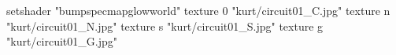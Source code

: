 setshader "bumpspecmapglowworld"
    texture 0 "kurt/circuit01_C.jpg"
    texture n "kurt/circuit01_N.jpg"
    texture s "kurt/circuit01_S.jpg"
    texture g "kurt/circuit01_G.jpg"